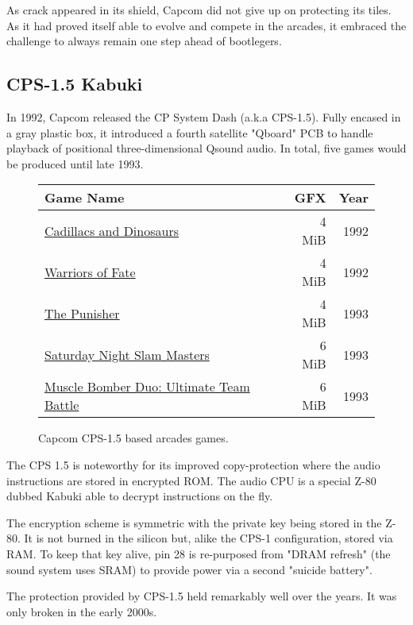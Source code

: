As crack appeared in its shield, Capcom did not give up on protecting its tiles. As it had proved itself able to evolve and compete in the arcades, it embraced the challenge to always remain one step ahead of bootlegers.

\subsection{CPS-1.5 Kabuki}
In 1992, Capcom released the CP System Dash (a.k.a CPS-1.5). Fully encased in a gray plastic box, it introduced a fourth satellite "Qboard" PCB to handle playback of positional three-dimensional Qsound audio. In total, five games would be produced until late 1993.

\begin{figure}[H]
{ \setlength{\tabcolsep}{3.0pt}
\begin{tabularx}{\textwidth}{Xrr}
  \toprule    
  \textbf{Game Name} & \textbf{ GFX }  & \textbf{ Year } \\               
  \toprule    
\href{}{Cadillacs and Dinosaurs} & 4 MiB & 1992 \\ 
\href{}{Warriors of Fate} & 4 MiB & 1992 \\ 
\href{}{The Punisher} & 4 MiB & 1993 \\ 
\href{}{Saturday Night Slam Masters} & 6 MiB & 1993 \\ 
\href{}{Muscle Bomber Duo: Ultimate Team Battle} & 6 MiB & 1993 \\ 
  \toprule    
\end{tabularx}%
}\caption*{Capcom CPS-1.5 based arcades games.}
\end{figure}

The CPS 1.5 is noteworthy for its improved copy-protection where the audio instructions are stored in encrypted ROM. The audio CPU is a special Z-80 dubbed Kabuki\cite{arcadeHackerKabuki} able to decrypt instructions on the fly.

The encryption scheme is symmetric with the private key being stored in the Z-80. It is not burned in the silicon but, alike the CPS-1 configuration, stored via RAM. To keep that key alive, pin 28 is re-purposed from "DRAM refresh" (the sound system uses SRAM) to provide power via a second "suicide battery". 

\begin{trivia}
The protection provided by CPS-1.5 held remarkably well over the years. It was only broken in the early 2000s\cite{ame_kabuki}.
\end{trivia}

